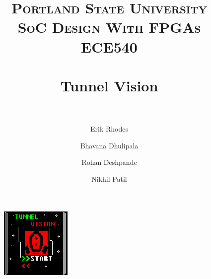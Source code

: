 \documentclass[11pt]{article}
\title{	
\normalfont \normalsize 
\textsc{\LARGE Portland State University}\\[1.5cm] %
\textsc{\Large SoC Design With FPGAs}\\[0.5cm] %
\textsc{\large ECE540}\\[0.5cm] %
\horrule{1.2pt} \\[0.4cm] %
\huge Tunnel Vision \\ %
\horrule{1.2pt} \\[0.5cm] %
}
\begin{document}
\raggedright
\author{Erik Rhodes \and Bhavana Dhulipala \and Rohan Deshpande \and Nikhil Patil} %
\maketitle %
\thispagestyle{empty}


\begin{figure}[h]\centering
\includegraphics[height=0.65\textwidth]{Images/start.png}
		\label{start}
	\end{figure}



%

%	
\end{document}
